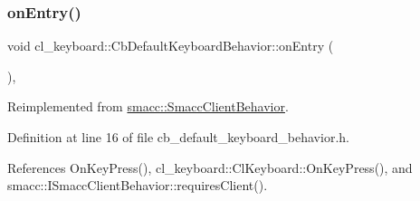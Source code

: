 \mbox{\label{classcl__keyboard_1_1CbDefaultKeyboardBehavior_a06e49d8c78aeffecf74c27b05f529a3a}} 
\subsubsection{\texorpdfstring{on\+Entry()}{onEntry()}}
{\footnotesize\ttfamily void cl\+\_\+keyboard\+::\+Cb\+Default\+Keyboard\+Behavior\+::on\+Entry (\begin{DoxyParamCaption}{ }\end{DoxyParamCaption})\hspace{0.3cm}{\ttfamily [inline]}, {\ttfamily [virtual]}}



Reimplemented from \hyperlink{classsmacc_1_1SmaccClientBehavior_ad5d3e1f1697c3cfe66c94cadba948493}{smacc\+::\+Smacc\+Client\+Behavior}.



Definition at line 16 of file cb\+\_\+default\+\_\+keyboard\+\_\+behavior.\+h.



References On\+Key\+Press(), cl\+\_\+keyboard\+::\+Cl\+Keyboard\+::\+On\+Key\+Press(), and smacc\+::\+I\+Smacc\+Client\+Behavior\+::requires\+Client().



